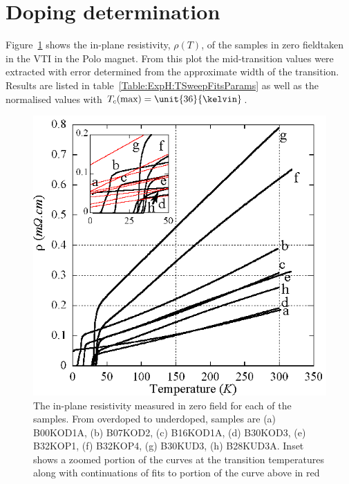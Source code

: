 
\section{Doping determination}

Figure~\ref{Fig:ExpH:TSweeps} shows the in-plane resistivity, $\rho(T)$, of the samples in zero fieldtaken in the \ac{VTI} in the Polo magnet. From this plot the mid-transition \Tc values were extracted with error determined from the approximate width of the transition. Results are listed in table~\ref{Table:ExpH:TSweepFitsParams} as well as the normalised \Tc values with $T_c(\textrm{max}) = \unit{36}{\kelvin}$.

\begin{figure}[htbp]
	\begin{center}
		\includegraphics[scale=0.9]{Chapter-HallBSCO/Figures/TSweeps/TSweeps}
		\caption{The in-plane resistivity measured in zero field for each of the samples. From overdoped to underdoped, samples are (a) B00KOD1A, (b) B07KOD2, (c) B16KOD1A, (d) B30KOD3, (e) B32KOP1, (f) B32KOP4, (g) B30KUD3, (h) B28KUD3A. Inset shows a zoomed portion of the curves at the transition temperatures along with continuations of fits to portion of the curve above \Tc in red}
		\label{Fig:ExpH:TSweeps}
	\end{center}
\end{figure}

